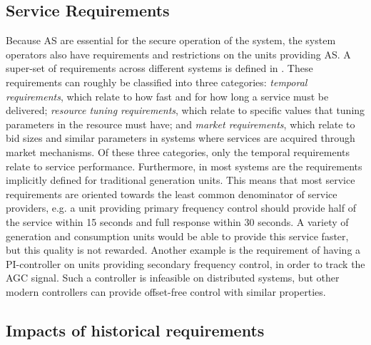 \subsection*{Service Requirements}
Because AS are essential for the secure operation of the system, the system operators also have requirements and restrictions on the units providing AS. A super-set of requirements across different systems is defined in \cite{Rebours}. These requirements can roughly be classified into three categories: \emph{temporal requirements}, which relate to how fast and for how long a service must be delivered; \emph{resource tuning requirements}, which relate to specific values that tuning parameters in the resource must have; and \emph{market requirements}, which relate to bid sizes and similar parameters in systems where services are acquired through market mechanisms. Of these three categories, only the temporal requirements relate to service performance. Furthermore, in most systems are the requirements implicitly defined for traditional generation units. This means that most service requirements are oriented towards the least common denominator of service providers, e.g. a unit providing primary frequency control should provide half of the service within 15 seconds and full response within 30 seconds\cite{energinet2012ancillary}. A variety of generation and consumption units would be able to provide this service faster, but this quality is not rewarded. Another example is the requirement of having a PI-controller on units providing secondary frequency control, in order to track the AGC signal. Such a controller is infeasible on distributed systems, but other modern controllers can provide offset-free control with similar properties.


%
\subsection*{Impacts of historical requirements}


